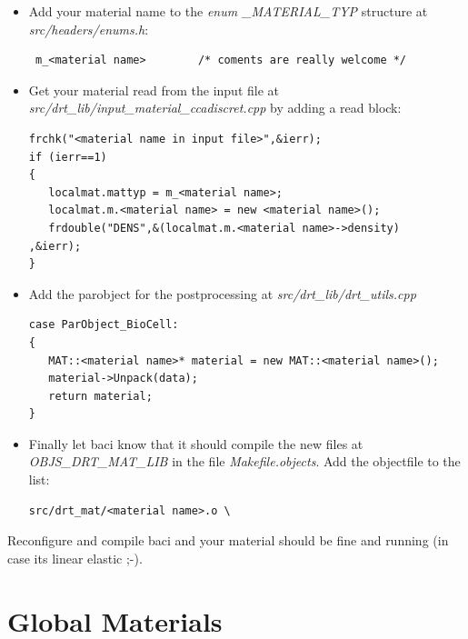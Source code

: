 \begin{itemize}
\item Add your material name to the \textit{enum \_MATERIAL\_TYP} structure at \textit{src/headers/enums.h}:
\begin{verbatim}
 m_<material name>        /* coments are really welcome */
\end{verbatim}

\item Get your material read from the input file at \textit{src/drt\_lib/input\_material\_ccadiscret.cpp} by adding a read block:
\begin{verbatim}
frchk("<material name in input file>",&ierr);
if (ierr==1)
{
   localmat.mattyp = m_<material name>;
   localmat.m.<material name> = new <material name>();
   frdouble("DENS",&(localmat.m.<material name>->density)        ,&ierr);
}
\end{verbatim}

\item Add the parobject for the postprocessing at \textit{src/drt\_lib/drt\_utils.cpp}
\begin{verbatim}
case ParObject_BioCell:
{
   MAT::<material name>* material = new MAT::<material name>();
   material->Unpack(data);
   return material;
}
\end{verbatim}

\item Finally let baci know that it should compile the new files at \textit{OBJS\_DRT\_MAT\_LIB} in the file \textit{Makefile.objects}. Add the objectfile to the list:
\begin{verbatim}
src/drt_mat/<material name>.o \
\end{verbatim}
\end{itemize}

Reconfigure and compile baci and your material should be fine and running (in case its linear elastic ;-).


\section{Global Materials}

